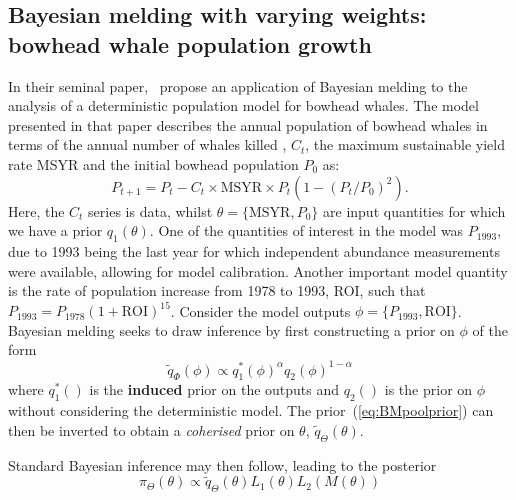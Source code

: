 \documentclass[a4paper, notitlepage, 10pt]{article}
\begin{document}

\subsection{Bayesian melding with varying weights: bowhead whale population growth}
\label{sec:bowhead}

In their seminal paper,~\cite{poole2000} propose an application of Bayesian melding to the analysis of a deterministic population model for bowhead whales.
The model presented in that paper describes the annual population of bowhead whales in terms of the annual number of whales killed , $C_t$, the maximum sustainable yield rate MSYR and the initial bowhead population $P_0$ as:
\begin{equation}
 P_{t + 1} = P_t - C_t \times \text{MSYR} \times P_t \left( 1- (P_t/P_0)^2 \right).
\end{equation}
Here, the $C_t$ series is data, whilst $\theta = \{ \text{MSYR}, P_0\}$ are input quantities for which we have a prior $q_1(\theta)$.
One of the quantities of interest in the model was $P_{\text{1993}}$, due to 1993 being the last year for which independent abundance measurements were available, allowing for model calibration.
Another important model quantity is the rate of population increase from 1978 to 1993, ROI, such that $P_{1993} = P_{1978}(1 + \text{ROI})^{15}$.
Consider the model outputs $\phi = \{P_{1993}, \text{ROI}\}$.
Bayesian melding seeks to draw inference by first constructing a prior on $\phi$ of the form
\begin{equation}
 \label{eq:BMpoolprior}
 \tilde{q}_{\Phi}(\phi) \propto q_1^\ast(\phi)^\alpha q_2(\phi)^{1-\alpha}
\end{equation}
where $q_1^\ast()$ is the \textbf{induced} prior on the outputs and $q_2()$ is the prior on $\phi$ without considering the deterministic model.
The prior~(\ref{eq:BMpoolprior}) can then be inverted to obtain a \textit{coherised} prior on $\theta$, $\tilde{q}_{\Theta}(\theta)$. 

Standard Bayesian inference may then follow,  leading to the posterior
\begin{equation}
 \label{eq:BMpoolposterior}
 \pi_{\Theta}(\theta) \propto \tilde{q}_{\Theta}(\theta) L_1(\theta) L_2(M(\theta))
\end{equation}
\end{document}

